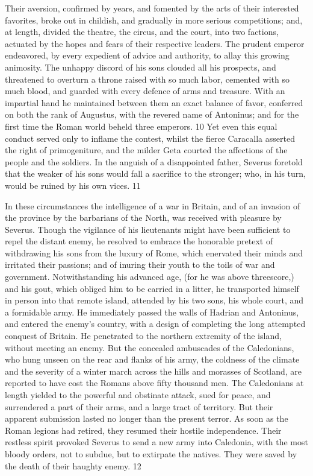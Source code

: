 Their aversion, confirmed by years, and fomented by the arts of
their interested favorites, broke out in childish, and gradually
in more serious competitions; and, at length, divided the
theatre, the circus, and the court, into two factions, actuated
by the hopes and fears of their respective leaders. The prudent
emperor endeavored, by every expedient of advice and authority,
to allay this growing animosity. The unhappy discord of his sons
clouded all his prospects, and threatened to overturn a throne
raised with so much labor, cemented with so much blood, and
guarded with every defence of arms and treasure. With an
impartial hand he maintained between them an exact balance of
favor, conferred on both the rank of Augustus, with the revered
name of Antoninus; and for the first time the Roman world beheld
three emperors. 10 Yet even this equal conduct served only to
inflame the contest, whilst the fierce Caracalla asserted the
right of primogeniture, and the milder Geta courted the
affections of the people and the soldiers. In the anguish of a
disappointed father, Severus foretold that the weaker of his sons
would fall a sacrifice to the stronger; who, in his turn, would
be ruined by his own vices. 11



In these circumstances the intelligence of a war in Britain, and
of an invasion of the province by the barbarians of the North,
was received with pleasure by Severus. Though the vigilance of
his lieutenants might have been sufficient to repel the distant
enemy, he resolved to embrace the honorable pretext of
withdrawing his sons from the luxury of Rome, which enervated
their minds and irritated their passions; and of inuring their
youth to the toils of war and government. Notwithstanding his
advanced age, (for he was above threescore,) and his gout, which
obliged him to be carried in a litter, he transported himself in
person into that remote island, attended by his two sons, his
whole court, and a formidable army. He immediately passed the
walls of Hadrian and Antoninus, and entered the enemy’s country,
with a design of completing the long attempted conquest of
Britain. He penetrated to the northern extremity of the island,
without meeting an enemy. But the concealed ambuscades of the
Caledonians, who hung unseen on the rear and flanks of his army,
the coldness of the climate and the severity of a winter march
across the hills and morasses of Scotland, are reported to have
cost the Romans above fifty thousand men. The Caledonians at
length yielded to the powerful and obstinate attack, sued for
peace, and surrendered a part of their arms, and a large tract of
territory. But their apparent submission lasted no longer than
the present terror. As soon as the Roman legions had retired,
they resumed their hostile independence. Their restless spirit
provoked Severus to send a new army into Caledonia, with the most
bloody orders, not to subdue, but to extirpate the natives. They
were saved by the death of their haughty enemy. 12


